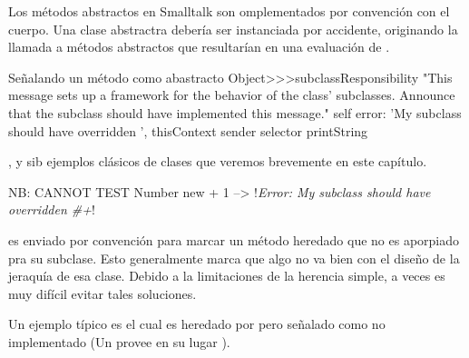 \documentclass[a4paper,10pt,twoside]{book}
\begin{document}

Los m\'etodos abstractos en Smalltalk son omplementados por convenci\'on con el cuerpo. Una clase abstractra deber\'ia ser instanciada por accidente, originando la llamada a m\'etodos abstractos que resultar\'ian en una evaluaci\'on de  .

\begin{method}{Señalando un m\'etodo como abastracto}
Object>>>subclassResponsibility
    "This message sets up a framework for the behavior of the class' subclasses.
    Announce that the subclass should have implemented this message."
    self error: 'My subclass should have overridden ', thisContext sender selector printString
\end{method}

,  y  sib ejemplos cl\'asicos de clases  que veremos brevemente en este cap\'itulo.

\begin{code}{NB: CANNOT TEST}
Number new + 1 --> !\emph{Error: My subclass should have overridden \#+}!
\end{code}

 es enviado por convenci\'on para marcar un m\'etodo heredado que no es aporpiado pra su subclase. Esto generalmente marca que algo no va bien con el diseño de la jeraqu\'ia de esa clase. Debido a la limitaciones de la herencia simple, a veces es muy dif\'icil evitar tales soluciones. 


Un ejemplo t\'ipico es  el cual es heredado por   pero señalado como no implementado (Un  provee en su lugar ).



\ifx\wholebook\relax\else
   
   
\end{document}
